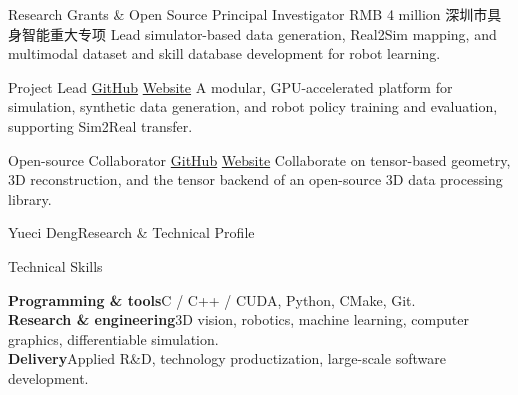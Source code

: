 \documentclass{resume}
\begin{document}
\begin{rSection}{Research Grants \& Open Source}
{Principal Investigator \enspace\textbar\enspace RMB 4 million \enspace\textbar\enspace 深圳市具身智能重大专项}
{Lead simulator-based data generation, Real2Sim mapping, and multimodal dataset and skill database development for robot learning.}

{Project Lead \enspace\textbar\enspace\href{https://github.com/DexForce/EmbodiChain}{GitHub} \enspace\textbar\enspace\href{https://dexforce.com/embodichain/index.html\#/}{Website}}
{A modular, GPU-accelerated platform for simulation, synthetic data generation, and robot policy training and evaluation, supporting Sim2Real transfer.}

{Open-source Collaborator \enspace\textbar\enspace\href{https://github.com/isl-org/Open3D}{GitHub} \enspace\textbar\enspace\href{https://www.open3d.org/}{Website}}
{Collaborate on tensor-based geometry, 3D reconstruction, and the tensor backend of an open-source 3D data processing library.}
\end{rSection}

\clearpage
{\small\sffamily\color{cvMuted}Yueci Deng\hfill Research \& Technical Profile\par}


\begin{rSection}{Technical Skills}
{\fontsize{9.3}{11.5}\selectfont
\textbf{Programming \& tools}\enspace C / C++ / CUDA, Python, CMake, Git.\\
\textbf{Research \& engineering}\enspace 3D vision, robotics, machine learning, computer graphics, differentiable simulation.\\
\textbf{Delivery}\enspace Applied R\&D, technology productization, large-scale software development.\par}
\end{rSection}
\end{document}
